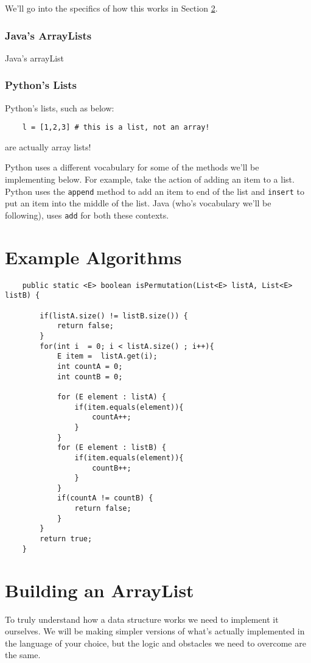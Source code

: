 We'll go into the specifics of how this works in Section \ref{buildingArraylist}.


\subsubsection{Java's ArrayLists}
Java's arrayList
\subsubsection{Python's Lists}
Python's lists, such as below:
\begin{verbatim}
	l = [1,2,3] # this is a list, not an array!	
\end{verbatim}
are actually array lists! %

Python uses a different vocabulary for some of the methods we'll be implementing below.  
For example, take the action of adding an item to a list.
Python uses the \texttt{append} method to add an item to end of the list and \texttt{insert} to put an item into the middle of the list.
Java (who's vocabulary we'll be following), uses \texttt{add} for both these contexts. 









\section{Example Algorithms}


\begin{verbatim}
	public static <E> boolean isPermutation(List<E> listA, List<E> listB) {
		
		if(listA.size() != listB.size()) {
			return false;
		}
		for(int i  = 0; i < listA.size() ; i++){
			E item =  listA.get(i);
			int countA = 0;
			int countB = 0;
			
			for (E element : listA) {
				if(item.equals(element)){
					countA++;
				}
			}
			for (E element : listB) {
				if(item.equals(element)){
					countB++;
				}
			}
			if(countA != countB) {
				return false;
			}
		}
		return true;
	}
\end{verbatim}



\section{Building an ArrayList}
\label{buildingArraylist}
To truly understand how a data structure works we need to implement it ourselves.  We will be making simpler versions of what's actually implemented in the language of your choice, but the logic and obstacles we need to overcome are the same.  

